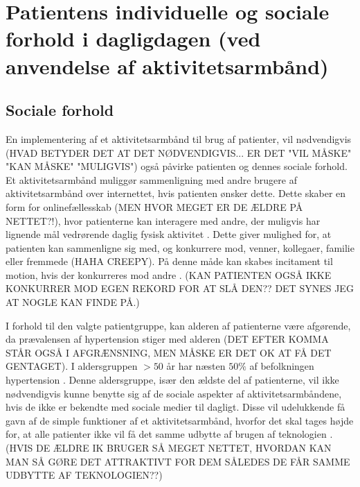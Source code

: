 \section{Patientens individuelle og sociale forhold i dagligdagen (ved anvendelse af aktivitetsarmbånd)}
\subsection{Sociale forhold}
En implementering af et aktivitetsarmbånd til brug af patienter, vil nødvendigvis (HVAD BETYDER DET AT DET NØDVENDIGVIS... ER DET "VIL MÅSKE" "KAN MÅSKE" "MULIGVIS") også påvirke patienten og dennes sociale forhold. Et aktivitetsarmbånd muliggør sammenligning med andre brugere af aktivitetsarmbånd over internettet, hvis patienten ønsker dette. Dette skaber en form for onlinefællesskab (MEN HVOR MEGET ER DE ÆLDRE PÅ NETTET?!), hvor patienterne kan interagere med andre, der muligvis har lignende mål vedrørende daglig fysisk aktivitet \citep{karapanos2016}. 
Dette giver mulighed for, at patienten kan sammenligne sig med, og konkurrere mod, venner, kollegaer, familie eller fremmede (HAHA CREEPY). På denne måde kan skabes incitament til motion, hvis der konkurreres mod andre \citep{rooksby2014}. (KAN PATIENTEN OGSÅ IKKE KONKURRER MOD EGEN REKORD FOR AT SLÅ DEN?? DET SYNES JEG AT NOGLE KAN FINDE PÅ.) 

I forhold til den valgte patientgruppe, kan alderen af patienterne være afgørende, da prævalensen af hypertension stiger med alderen (DET EFTER KOMMA STÅR OGSÅ I AFGRÆNSNING, MEN MÅSKE ER DET OK AT FÅ DET GENTAGET). I aldersgruppen $>50$ år har næsten $50 \%$ af befolkningen hypertension \citep{kronborg2008}. Denne aldersgruppe, især den ældste del af patienterne, vil ikke nødvendigvis kunne benytte sig af de sociale aspekter af aktivitetsarmbåndene, hvis de ikke er bekendte med sociale medier til dagligt. Disse vil udelukkende få gavn af de simple funktioner af et aktivitetsarmbånd, hvorfor det skal tages højde for, at alle patienter ikke vil få det samme udbytte af brugen af teknologien \citep{mercer2016}. (HVIS DE ÆLDRE IK BRUGER SÅ MEGET NETTET, HVORDAN KAN MAN SÅ GØRE DET ATTRAKTIVT FOR DEM SÅLEDES DE FÅR SAMME UDBYTTE AF TEKNOLOGIEN??)

